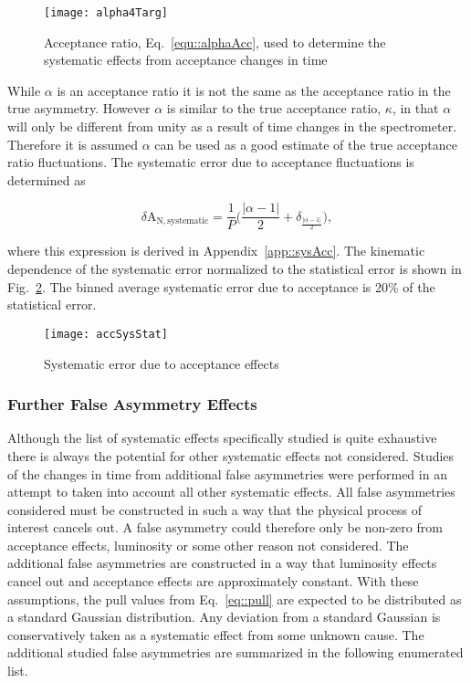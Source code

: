 \begin{figure}[h!t]
  \begin{center}
    \texttt{[image: alpha4Targ]}
    \caption{Acceptance ratio, Eq.~\ref{equ::alphaAcc}, used to determine the
      systematic effects from acceptance changes in time}
    \label{fig::alpha}
  \end{center}
\end{figure}

While $\alpha$ is an acceptance ratio it is not the same as the acceptance ratio
in the true asymmetry.  However $\alpha$ is similar to the true acceptance
ratio, $\kappa$, in that $\alpha$ will only be different from unity as a result
of time changes in the spectrometer.  Therefore it is assumed $\alpha$ can be
used as a good estimate of the true acceptance ratio fluctuations.  The
systematic error due to acceptance fluctuations is determined as

\begin{equation}
  \delta\mathrm{A}_{\mathrm{N,systematic}} =
  \frac{1}{P} \Big(\frac{|\alpha-1|}{2} + \delta_{\frac{|\alpha-1|}{2}} \Big),
\end{equation}

\noindent
where this expression is derived in Appendix~\ref{app::sysAcc}.  The kinematic
dependence of the systematic error normalized to the statistical error is shown
in Fig.~\ref{fig::accSysStat}.  The binned average systematic error due to
acceptance is 20\% of the statistical error.

\begin{figure}[h!t]
  \begin{center}
    \texttt{[image: accSysStat]}
    \caption{Systematic error due to acceptance effects}
    \label{fig::accSysStat}
  \end{center}
\end{figure}

\subsubsection{Further False Asymmetry Effects}
Although the list of systematic effects specifically studied is quite exhaustive
there is always the potential for other systematic effects not considered.
Studies of the changes in time from additional false asymmetries were performed
in an attempt to taken into account all other systematic effects.  All false
asymmetries considered must be constructed in such a way that the physical
process of interest cancels out.  A false asymmetry could therefore only be
non-zero from acceptance effects, luminosity or some other reason not
considered.  The additional false asymmetries are constructed in a way that
luminosity effects cancel out and acceptance effects are approximately constant.
With these assumptions, the pull values from Eq.~\ref{eq::pull} are expected to
be distributed as a standard Gaussian distribution.  Any deviation from a
standard Gaussian is conservatively taken as a systematic effect from some
unknown cause.  The additional studied false asymmetries are summarized in the
following enumerated list.

